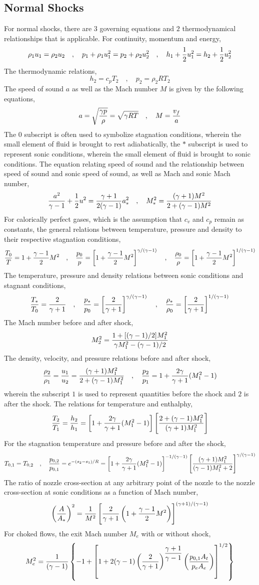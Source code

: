 \documentclass[class=report, 12pt, crop=false]{standalone}
\begin{document}
\begin{center}
\subsection{Normal Shocks}
\begin{comment}
\end{comment}
For normal shocks, there are $3$ governing equations and $2$ thermodynamical relationships that is applicable. For continuity, momentum and energy,
$$\rho_1u_1 = \rho_2u_2 \quad,\quad p_1 + \rho_1 u_1^2 = p_2 + \rho_2 u_2^2 \quad,\quad h_1 + \frac{1}{2}u_1^2 = h_2 + \frac{1}{2}u_2^2$$
The thermodynamic relations,    
$$h_2 = c_pT_2 \quad,\quad p_2 = \rho_2 RT_2$$
The speed of sound $a$ as well as the Mach number $M$ is given by the following equations,$$a = \sqrt{\frac{\gamma p}{\rho}} = \sqrt{\gamma RT} \quad,\quad M = \frac{v_f}{a}$$
The $0$ subscript is often used to symbolize stagnation conditions, wherein the small element of fluid is brought to rest adiabatically, the $*$ subscript is used to represent sonic conditions, wherein the small element of fluid is brought to sonic conditions. The equation relating speed of sound and the relationship between speed of sound and sonic speed of sound, as well as Mach and sonic Mach number,
$$\frac{a^2}{\gamma-1} + \frac{1}{2}u^2 = \frac{\gamma+1}{2(\gamma-1)}a_*^2\quad,\quad M_*^2 = \frac{(\gamma+1)M^2}{2 + (\gamma-1)M^2}$$
For calorically perfect gases, which is the assumption that $c_v$ and $c_p$ remain as constants, the general relations between temperature, pressure and density to their respective stagnation conditions,
$$\frac{T_0}{T} = 1 + \frac{\gamma-1}{2}M^2 \quad,\quad \frac{p_0}{p} = \left[1 + \frac{\gamma-1}{2}M^2\right]^{\gamma/(\gamma-1)} \quad,\quad \frac{\rho_0}{\rho} = \left[1 + \frac{\gamma-1}{2}M^2\right]^{1/(\gamma-1)}$$
The temperature, pressure and density relations between sonic conditions and stagnant conditions,
$$\frac{T_*}{T_0} = \frac{2}{\gamma+1} \quad,\quad \frac{p_*}{p_0} = \left[\frac{2}{\gamma+1}\right]^{\gamma/(\gamma-1)} \quad,\quad \frac{\rho_*}{\rho_0} = \left[\frac{2}{\gamma+1}\right]^{1/(\gamma-1)}$$
The Mach number before and after shock,
$$M_2^2 = \frac{1+[(\gamma-1)/2]M_1^2}{\gamma M_1^2-(\gamma-1)/2}$$
The density, velocity, and pressure relations before and after shock,
$$\frac{\rho_2}{\rho_1} = \frac{u_1}{u_2} = \frac{(\gamma+1)M_1^2}{2+(\gamma-1)M_1^2} \quad,\quad \frac{p_2}{p_1} = 1 + \frac{2\gamma}{\gamma+1}(M_1^2 - 1)$$
wherein the subscript $1$ is used to represent quantities before the shock and $2$ is after the shock. The relations for temperature and enthalphy,
$$\frac{T_2}{T_1} = \frac{h_2}{h_1} = \left[1 + \frac{2\gamma}{\gamma+1}(M_1^2 - 1)\right]\left[\frac{2+(\gamma-1)M_1^2}{(\gamma+1)M_1^2}\right]$$
For the stagnation temperature and pressure before and after the shock,
$$T_{0,1} = T_{0,2} \quad,\quad \frac{p_{0,2}}{p_{0,1}} = e^{-(s_2-s_1)/R} = \left[1+\frac{2\gamma}{\gamma+1}(M_1^2-1)\right]^{-1/(\gamma-1)}\left[\frac{(\gamma+1)M_1^2}{(\gamma-1)M_1^2+2}\right]^{\gamma/(\gamma-1)}$$
The ratio of nozzle cross-section at any arbitrary point of the nozzle to the nozzle cross-section at sonic conditions as a function of Mach number,
$$\left(\frac{A}{A_*}\right)^2 = \frac{1}{M^2}\left[\frac{2}{\gamma+1}\left(1+\frac{\gamma-1}{2}M^2\right)\right]^{(\gamma+1)/(\gamma-1)}$$
For choked flows, the exit Mach number $M_e$ with or without shock,
$$M_e^2 = \frac{1}{(\gamma-1)}\left\{-1 + \left[1 + 2(\gamma-1)\left(\frac{2}{\gamma+1}\right)^{\displaystyle{\frac{\gamma+1}{\gamma-1}}}\left(\frac{p_{0,1}A_t}{p_e A_e}\right)\right]^{1/2}\right\}$$

\end{center}
\end{document}
